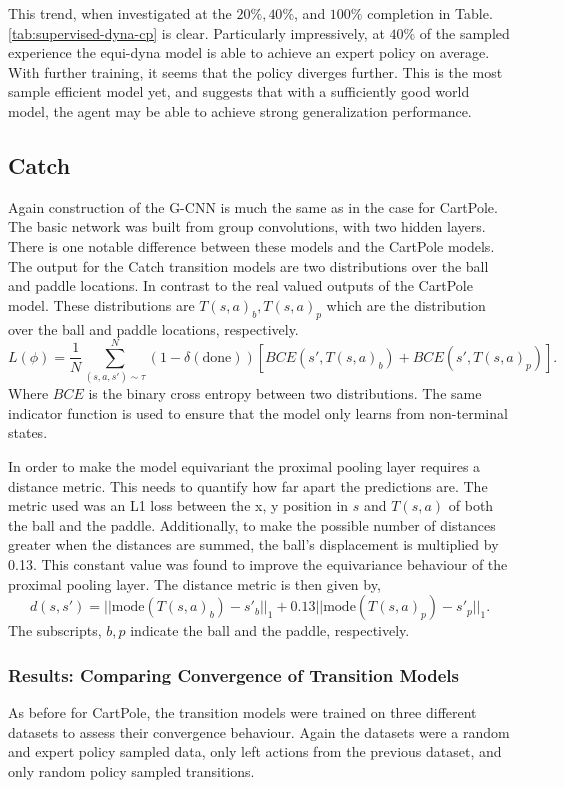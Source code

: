 This trend, when investigated at the $20\%, 40\%$, and $100\%$ completion in Table.\ref{tab:supervised-dyna-cp} is clear. Particularly impressively, at $40\%$ of the sampled experience the equi-dyna model is able to achieve an expert policy on average. With further training, it seems that the policy diverges further. This is the most sample efficient model yet, and suggests that with a sufficiently good world model, the agent may be able to achieve strong generalization performance.
\subsection{Catch}

Again construction of the G-CNN is much the same as in the case for CartPole. The basic network was built from group convolutions, with two hidden layers. There is one notable difference between these models and the CartPole models. The output for the Catch transition models are two distributions over the ball and paddle locations. In contrast to the real valued outputs of the CartPole model. These distributions are $T(s, a)_b, T(s, a)_p$ which are the distribution over the ball and paddle locations, respectively.
\begin{equation}
	L(\phi) = \frac{1}{N}\sum_{(s, a, s') \sim \tau}^N(1- \delta (\text{done}))\left[BCE(s', T(s, a)_b) + BCE(s', T(s, a)_p)\right] .
\end{equation}
Where $BCE$ is the binary cross entropy between two distributions. The same indicator function is used to ensure that the model only learns from non-terminal states.

In order to make the model equivariant the proximal pooling layer requires  a distance metric. This needs to quantify how far apart the predictions are. The metric used was an L1 loss between the x, y position in $s$ and $T(s,a)$ of both the ball and the paddle. Additionally, to make the possible number of distances greater when the distances are summed, the ball's displacement is multiplied by 0.13. This constant value was found to improve the equivariance behaviour of the proximal pooling layer. The distance metric is then given by,
\begin{equation}
	d(s, s') = ||\text{mode}(T(s, a)_b) - s'_b||_1 + 0.13 ||\text{mode}(T(s, a)_p )- s'_p||_1.
\end{equation}
The subscripts, $b, p$ indicate the ball and the paddle, respectively.

\subsubsection{Results: Comparing Convergence of Transition Models}
As before for CartPole, the transition models were trained on three different datasets to assess their convergence behaviour. Again the datasets were a random and expert policy sampled data, only left actions from the previous dataset, and only random policy sampled transitions.

